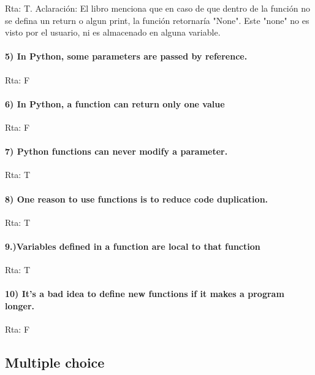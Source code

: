 \documentclass[11pt]{article}
\begin{document}
Rta: T. Aclaración: El libro menciona que en caso de que dentro de la
función no se defina un return o algun print, la función retornaría
"None". Este "none" no es visto por el usuario, ni es almacenado en
alguna variable.

    \paragraph{5) In Python, some parameters are passed by
reference.}\label{in-python-some-parameters-are-passed-by-reference.}

Rta: F

    \paragraph{6) In Python, a function can return only one
value}\label{in-python-a-function-can-return-only-one-value}

Rta: F

    \paragraph{7) Python functions can never modify a
parameter.}\label{python-functions-can-never-modify-a-parameter.}

Rta: T

    \paragraph{8) One reason to use functions is to reduce code
duplication.}\label{one-reason-to-use-functions-is-to-reduce-code-duplication.}

Rta: T

    \paragraph{9.)Variables defined in a function are local to that
function}\label{variables-defined-in-a-function-are-local-to-that-function}

Rta: T

    \paragraph{10) It's a bad idea to define new functions if it makes a
program
longer.}\label{its-a-bad-idea-to-define-new-functions-if-it-makes-a-program-longer.}

Rta: F

    \subsection{Multiple choice}\label{multiple-choice}
\end{document}
